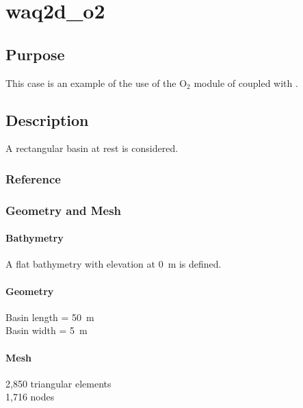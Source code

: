 \chapter{waq2d\_o2}
%
%
\section{Purpose}
%
This case is an example of the use of the O$_2$ module of \waqtel coupled with .
%
\section{Description}
%
A rectangular basin at rest is considered.
%
%
%
%
\subsection{Reference}
%

%
%
%
\subsection{Geometry and Mesh}
%
\subsubsection{Bathymetry}
%
A flat bathymetry with elevation at 0~m is defined.
%
\subsubsection{Geometry}
%
Basin length = 50~m\\
Basin width = 5~m
%
\subsubsection{Mesh}
%
2,850 triangular elements\\
1,716 nodes
%
%
%
